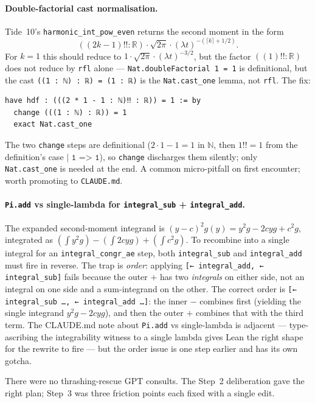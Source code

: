 \documentclass[11pt]{article}
\begin{document}
\paragraph{Double-factorial cast normalisation.} Tide~10's
\texttt{harmonic\_int\_pow\_even} returns the second moment in the
form
\[
  ((2k - 1)\text{!!} : \mathbb{R}) \cdot \sqrt{2\pi}
   \cdot (\lambda t)^{-(\lceil k\rceil + 1/2)}.
\]
For $k = 1$ this should reduce to $1 \cdot \sqrt{2\pi} \cdot (\lambda
t)^{-3/2}$, but the factor $((1)\text{!!} : \mathbb{R})$ does not
reduce by \texttt{rfl} alone — \texttt{Nat.doubleFactorial 1 = 1} is
definitional, but the cast \texttt{((1 : ℕ) : ℝ) = (1 : ℝ)} is the
\texttt{Nat.cast\_one} lemma, not \texttt{rfl}. The fix:
\begin{verbatim}
have hdf : (((2 * 1 - 1 : ℕ)‼ : ℝ)) = 1 := by
  change (((1 : ℕ) : ℝ)) = 1
  exact Nat.cast_one
\end{verbatim}
The two \texttt{change} steps are definitional ($2\cdot 1 - 1 = 1$ in
$\mathbb{N}$, then $1\text{!!} = 1$ from the definition's case
$\texttt{| 1 => 1}$), so \texttt{change} discharges them silently;
only \texttt{Nat.cast\_one} is needed at the end. A common micro-pitfall
on first encounter; worth promoting to \texttt{CLAUDE.md}.

\paragraph{\texttt{Pi.add} vs single-lambda for \texttt{integral\_sub} +
\texttt{integral\_add}.} The expanded second-moment integrand is
$(y - c)^2 g(y) = y^2 g - 2c y g + c^2 g$, integrated as
$(\int y^2 g) - (\int 2c y g) + (\int c^2 g)$. To recombine into a
single integral for an \texttt{integral\_congr\_ae} step, both
\texttt{integral\_sub} and \texttt{integral\_add} must fire in
reverse. The trap is \emph{order}: applying \texttt{[← integral\_add,
← integral\_sub]} fails because the outer $+$ has two \emph{integrals}
on either side, not an integral on one side and a sum-integrand on
the other. The correct order is \texttt{[← integral\_sub …, ←
integral\_add …]}: the inner $-$ combines first
(yielding the single integrand $y^2 g - 2c y g$), and then the outer
$+$ combines that with the third term. The CLAUDE.md note about
\texttt{Pi.add} vs single-lambda is adjacent — type-ascribing the
integrability witness to a single lambda gives Lean the right shape
for the rewrite to fire — but the order issue is one step earlier and
has its own gotcha.

There were no thrashing-rescue GPT consults. The Step~2 deliberation
gave the right plan; Step~3 was three friction points each fixed with
a single edit.
\end{document}
